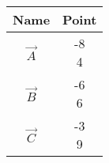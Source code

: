 \begin{tabular}[12pt]{ |c| c|}
    \hline
    \textbf{Name} & \textbf{Point}\\ 
    \hline
    $\Vec{A}$ & \myvec{-8\\4} \\
    \hline 
    $\Vec{B}$ & \myvec{-6\\6} \\
    \hline
    $\Vec{C}$ & \myvec{-3\\9}\\
    \hline
    \end{tabular}\\